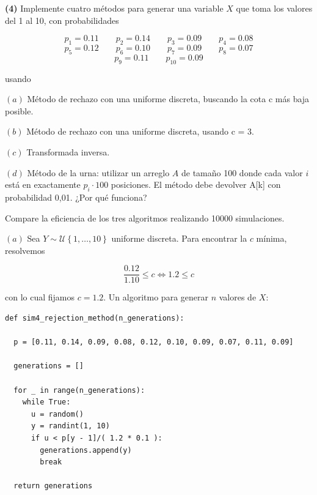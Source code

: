 \documentclass[a4paper, 12pt]{article}
\begin{document}
\pagebreak 

\begin{myframe}
\textbf{(4)} Implemente cuatro métodos para generar una variable $X$ que toma los
valores del 1 al 10, con probabilidades

\begin{equation*}
  p_1 = 0.11 \qquad p_2 = 0.14 \qquad p_3 = 0.09 \qquad p_4 = 0.08
\end{equation*}
\begin{equation*}
  p_5 = 0.12 \qquad p_6 = 0.10 \qquad p_7 = 0.09 \qquad p_8 = 0.07
\end{equation*}
\begin{equation*}
  p_9 = 0.11 \qquad p_{10} = 0.09 
\end{equation*}

usando

$(a)$ Método de rechazo con una uniforme discreta, buscando la cota c más baja
posible. 

$(b)$ Método de rechazo con una uniforme discreta, usando c = 3. 

$(c)$ Transformada inversa. 

$(d)$ Método de la urna: utilizar un arreglo $A$ de tamaño 100 donde cada valor
$i$ está en exactamente $p_i\cdot 100$ posiciones. El método debe devolver A[k]
con probabilidad 0,01. ¿Por qué funciona?

Compare la eficiencia de los tres algoritmos realizando 10000 simulaciones.

\end{myframe}

$(a)$ Sea $Y \sim \mathcal{U}\left\{ 1,\ldots, 10 \right\} $ uniforme discreta. Para encontrar la $c$ mínima, resolvemos 

\begin{equation*}
  \frac{0.12}{1.10} \leq c \iff 1.2 \leq c
\end{equation*}

con lo cual fijamos $c = 1.2$. Un algoritmo para generar $n$ valores de $X$:

\begin{verbatim}
def sim4_rejection_method(n_generations):

  p = [0.11, 0.14, 0.09, 0.08, 0.12, 0.10, 0.09, 0.07, 0.11, 0.09]

  generations = []

  for _ in range(n_generations):
    while True:
      u = random()
      y = randint(1, 10)
      if u < p[y - 1]/( 1.2 * 0.1 ):
        generations.append(y)
        break
  
  return generations
\end{verbatim}
\end{document}
